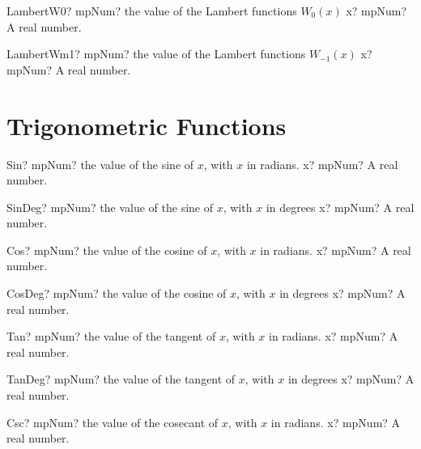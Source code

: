 \documentclass[12pt,a4paper,openany]{book}
\begin{document}
\begin{mpFunctionsExtract}
\mpFunctionOne
{LambertW0? mpNum? the value of the Lambert functions $W_0(x)$}
{x? mpNum? A real number.}
\end{mpFunctionsExtract}

\begin{mpFunctionsExtract}
\mpFunctionOne
{LambertWm1? mpNum? the value of the Lambert functions $W_{-1}(x)$}
{x? mpNum? A real number.}
\end{mpFunctionsExtract}

\section{Trigonometric Functions}

\begin{mpFunctionsExtract}
\mpFunctionOne
{Sin? mpNum? the value of the sine of $x$, with $x$ in radians.}
{x? mpNum? A real number.}
\end{mpFunctionsExtract}

\begin{mpFunctionsExtract}
\mpFunctionOne
{SinDeg? mpNum? the value of the sine of $x$, with $x$ in degrees}
{x? mpNum? A real number.}
\end{mpFunctionsExtract}

\begin{mpFunctionsExtract}
\mpFunctionOne
{Cos? mpNum? the value of the cosine of $x$, with $x$ in radians.}
{x? mpNum? A real number.}
\end{mpFunctionsExtract}

\begin{mpFunctionsExtract}
\mpFunctionOne
{CosDeg? mpNum? the value of the cosine of $x$, with $x$ in degrees}
{x? mpNum? A real number.}
\end{mpFunctionsExtract}

\begin{mpFunctionsExtract}
\mpFunctionOne
{Tan? mpNum? the value of the tangent of $x$, with $x$ in radians.}
{x? mpNum? A real number.}
\end{mpFunctionsExtract}

\begin{mpFunctionsExtract}
\mpFunctionOne
{TanDeg? mpNum? the value of the tangent of $x$, with $x$ in degrees}
{x? mpNum? A real number.}
\end{mpFunctionsExtract}

\begin{mpFunctionsExtract}
\mpFunctionOne
{Csc? mpNum? the value of the cosecant of $x$, with $x$ in radians.}
{x? mpNum? A real number.}
\end{mpFunctionsExtract}
\end{document}
